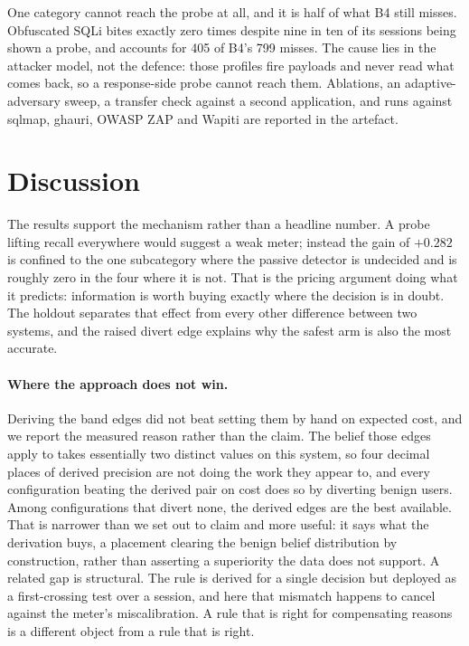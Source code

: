 \documentclass[runningheads]{llncs}
\begin{document}
One category cannot reach the probe at all, and it is half of what B4 still misses.
Obfuscated SQLi bites exactly zero times despite nine in ten of its sessions being
shown a probe, and accounts for 405 of B4's 799 misses. The cause lies in the
attacker model, not the defence: those profiles fire payloads and never read what
comes back, so a response-side probe cannot reach them. Ablations, an
adaptive-adversary sweep, a transfer check against a second application, and runs
against sqlmap, ghauri, OWASP ZAP and Wapiti are reported in the artefact.


\section{Discussion}
\label{sec:discussion}

The results support the mechanism rather than a headline number. A probe lifting
recall everywhere would suggest a weak meter; instead the gain of $+0.282$ is
confined to the one subcategory where the passive detector is undecided and is
roughly zero in the four where it is not. That is the pricing argument doing what it
predicts: information is worth buying exactly where the decision is in doubt. The
holdout separates that effect from every other difference between two systems, and
the raised divert edge explains why the safest arm is also the most accurate.

\paragraph{Where the approach does not win.}
Deriving the band edges did not beat setting them by hand on expected cost, and we
report the measured reason rather than the claim. The belief those edges apply to
takes essentially two distinct values on this system, so four decimal places of
derived precision are not doing the work they appear to, and every configuration
beating the derived pair on cost does so by diverting benign users. Among
configurations that divert none, the derived edges are the best available. That is
narrower than we set out to claim and more useful: it says what the derivation buys,
a placement clearing the benign belief distribution by construction, rather than
asserting a superiority the data does not support. A related gap is structural. The
rule is derived for a single decision but deployed as a first-crossing test over a
session, and here that mismatch happens to cancel against the meter's
miscalibration. A rule that is right for compensating reasons is a different object
from a rule that is right.
\end{document}
